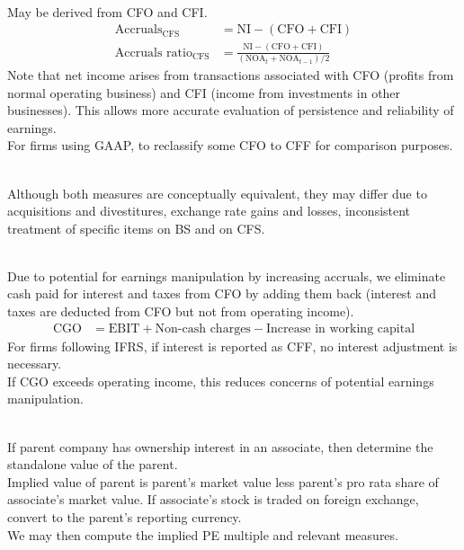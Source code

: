 \begin{definition} \\
May be derived from CFO and CFI.
\begin{align}
\text{Accruals}_{\text{CFS}} &= \text{NI} - (\text{CFO} + \text{CFI}) \nonumber \\
\text{Accruals ratio}_{\text{CFS}} &= \frac{\text{NI} - (\text{CFO} + \text{CFI})}{(\text{NOA}_{t} + \text{NOA}_{t-1})/2} \nonumber
\end{align}
Note that net income arises from transactions associated with CFO (profits from normal operating business) and CFI (income from investments in other businesses). This allows more accurate evaluation of persistence and reliability of earnings.\\
For firms using GAAP, to reclassify some CFO to CFF for comparison purposes.
\end{definition}

\begin{remark} \\
Although both measures are conceptually equivalent, they may differ due to acquisitions and divestitures, exchange rate gains and losses, inconsistent treatment of specific items on BS and on CFS.
\end{remark}

\begin{definition} \\
Due to potential for earnings manipulation by increasing accruals, we eliminate cash paid for interest and taxes from CFO by adding them back (interest and taxes are deducted from CFO but not from operating income).
\begin{align}
\text{CGO} &= \text{EBIT} + \text{Non-cash charges} - \text{Increase in working capital} \nonumber
\end{align}
For firms following IFRS, if interest is reported as CFF, no interest adjustment is necessary.\\
If CGO exceeds operating income, this reduces concerns of potential earnings manipulation.
\end{definition}

\begin{remark} \\
If parent company has ownership interest in an associate, then determine the standalone value of the parent.\\
Implied value of parent is parent's market value less parent's pro rata share of associate's market value. If associate's stock is traded on foreign exchange, convert to the parent's reporting currency.\\
We may then compute the implied PE multiple and relevant measures.
\end{remark}
